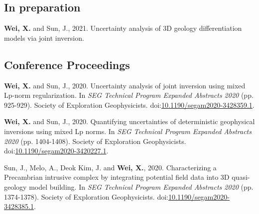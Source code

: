 \documentclass[11pt, a4paper]{article}
\newcommand{\LastName}{Wei}
\newcommand{\Initials}{X}
\newcommand{\Wei}{\textbf{\LastName, \Initials.}}  %
\newcommand{\WeiSun}{\textbf{\LastName, \Initials.} and Sun, J.}  %
\newcommand{\Future}{future}
\newcommand{\DOI}[1]{doi:\href{https://doi.org/#1}{#1}}
\begin{document}
\subsection*{In preparation}
\begin{etaremune}
	
	\item
	\WeiSun, 2021. Uncertainty analysis of 3D geology differentiation models via joint inversion. 
	
\end{etaremune}

\subsection*{Conference Proceedings}
\begin{etaremune}
	
	\item 
	\WeiSun, 2020. Uncertainty analysis of joint inversion using mixed Lp-norm regularization. In \emph{SEG Technical Program Expanded Abstracts 2020} (pp. 925-929). Society of Exploration Geophysicists. \DOI{10.1190/segam2020-3428359.1}.

	\item 
	\WeiSun, 2020. Quantifying uncertainties of deterministic geophysical inversions using mixed Lp norms. In \emph{SEG Technical Program Expanded Abstracts 2020} (pp. 1404-1408). Society of Exploration Geophysicists. \DOI{10.1190/segam2020-3420227.1}.
	
	\item 
	Sun, J., Melo, A., Deok Kim, J. and \Wei, 2020. Characterizing a Precambrian intrusive complex by integrating potential field data into 3D quasi-geology model building. In \emph{SEG Technical Program Expanded Abstracts 2020} (pp. 1374-1378). Society of Exploration Geophysicists. \DOI{10.1190/segam2020-3428385.1}.
		
\end{etaremune}


%	
%	
\end{document}
